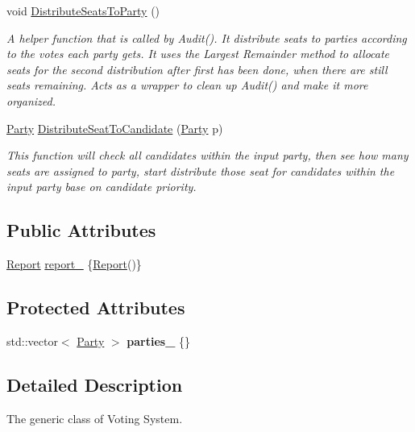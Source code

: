 \begin{DoxyCompactItemize}
void \hyperlink{classVotingType_a38b581488ff63dde73225360b56161dc}{Distribute\+Seats\+To\+Party} ()
\begin{DoxyCompactList}\small\item\em A helper function that is called by Audit(). It distribute seats to parties according to the votes each party gets. It uses the Largest Remainder method to allocate seats for the second distribution after first has been done, when there are still seats remaining. Acts as a wrapper to clean up Audit() and make it more organized. \end{DoxyCompactList}\item 
\hyperlink{classParty}{Party} \hyperlink{classVotingType_a7752ec81cc1d302587fa1cba66bd12e4}{Distribute\+Seat\+To\+Candidate} (\hyperlink{classParty}{Party} p)
\begin{DoxyCompactList}\small\item\em This function will check all candidates within the input party, then see how many seats are assigned to party, start distribute those seat for candidates within the input party base on candidate priority. \end{DoxyCompactList}\end{DoxyCompactItemize}
\subsection*{Public Attributes}
\begin{DoxyCompactItemize}
\item 
\hyperlink{classReport}{Report} \hyperlink{classVotingType_ae1e98bd725c232d76dff9ed44eb0743c}{report\+\_\+} \{\hyperlink{classReport}{Report}()\}
\end{DoxyCompactItemize}
\subsection*{Protected Attributes}
\begin{DoxyCompactItemize}
\item 
\mbox{\label{classVotingType_a0d13288533b82c8dd29acf4e9e8db90e}} 
std\+::vector$<$ \hyperlink{classParty}{Party} $>$ {\bfseries parties\+\_\+} \{\}
\end{DoxyCompactItemize}


\subsection{Detailed Description}
The generic class of Voting System. 

